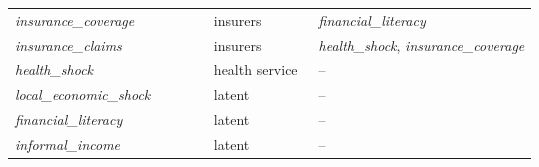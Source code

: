 \documentclass[a4paper,11pt]{article}
\begin{document}
\begin{table}[h]
\begin{tabular}{@{}l >{\raggedright\arraybackslash}p{0.2\linewidth} >{\raggedright\arraybackslash}p{0.42\linewidth}@{}}
\textit{insurance\_coverage} & insurers & \textit{financial\_literacy} \\
\textit{insurance\_claims} & insurers & \textit{health\_shock}, \textit{insurance\_coverage} \\
\textit{health\_shock} & health service & -- \\
\textit{local\_economic\_shock} & latent & -- \\
\textit{financial\_literacy} & latent & -- \\
\textit{informal\_income} & latent & -- \\
\bottomrule
\end{tabular}
\end{table}
\end{document}
